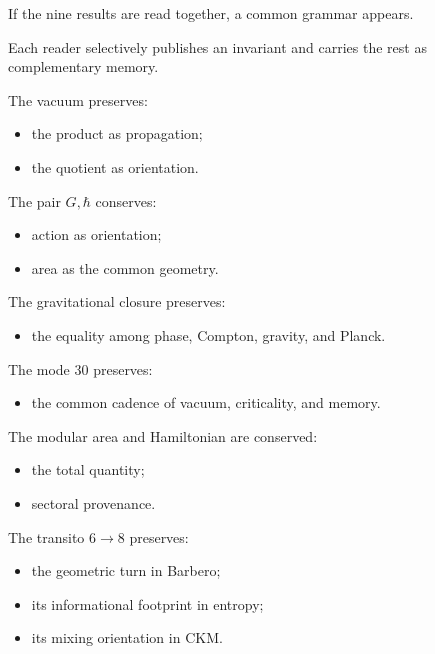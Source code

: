If the nine results are read together, a common grammar appears.\par

Each reader selectively publishes an invariant and carries the rest as complementary memory.\par

The vacuum preserves:\par

\begin{itemize}[leftmargin=*,itemsep=0.35em]
\item the product as propagation;
\item the quotient as orientation.
\end{itemize}

The pair \(G,\hbar\) conserves:\par

\begin{itemize}[leftmargin=*,itemsep=0.35em]
\item action as orientation;
\item area as the common geometry.
\end{itemize}

The gravitational closure preserves:\par

\begin{itemize}[leftmargin=*,itemsep=0.35em]
\item the equality among phase, Compton, gravity, and Planck.
\end{itemize}

The mode \(30\) preserves:\par

\begin{itemize}[leftmargin=*,itemsep=0.35em]
\item the common cadence of vacuum, criticality, and memory.
\end{itemize}

The modular area and Hamiltonian are conserved:\par

\begin{itemize}[leftmargin=*,itemsep=0.35em]
\item the total quantity;
\item sectoral provenance.
\end{itemize}

The transito \(6\to8\) preserves:\par

\begin{itemize}[leftmargin=*,itemsep=0.35em]
\item the geometric turn in Barbero;
\item its informational footprint in entropy;
\item its mixing orientation in CKM.
\end{itemize}

